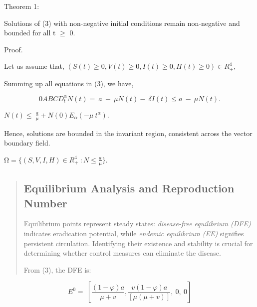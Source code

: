 \documentclass[10pt]{NSP1}
\begin{document}
Theorem 1:

Solutions of (3) with non-negative initial conditions remain non-negative and bounded for all t $\ge$ 0.

Proof.

Let us assume that, \(\left( S(t) \geq 0,V(t) \geq 0,I(t) \geq 0,H(t) \geq 0 \right) \in R_{+}^{4}\),

Summing up all equations in (3), we have,

\[0ABCD_{t}^{\alpha}N(t) = \ a\  - \ \mu N(t) - \ \delta I(t) \leq a\  - \ \mu N(t).\]

\(N(t) \leq \ \frac{a}{\mu} + N(0)E_{\alpha}\left( - \mu{\ t}^{\alpha} \right)\).

Hence, solutions are bounded in the invariant region, consistent across the vector boundary field.

\(\mathrm{\Omega} = \{(S,V,I,H) \in R_{+}^{4}\ :N \leq \frac{a}{\mu}\}\).

\begin{quote}
\subsection{Equilibrium Analysis and Reproduction Number}

Equilibrium points represent steady states: \emph{disease-free equilibrium (DFE)} indicates eradication potential, while \emph{endemic equilibrium (EE)} signifies persistent circulation. Identifying their existence and stability is crucial for determining whether control measures can eliminate the disease.

From (3), the DFE is:
\end{quote}

\[E^{0} = \ \left\lbrack \frac{(1 - \varphi)a}{\mu + v},\frac{v(1 - \varphi)a}{\left\lbrack \mu(\mu + v) \right\rbrack},\ 0,\ 0 \right\rbrack\]
\end{document}
